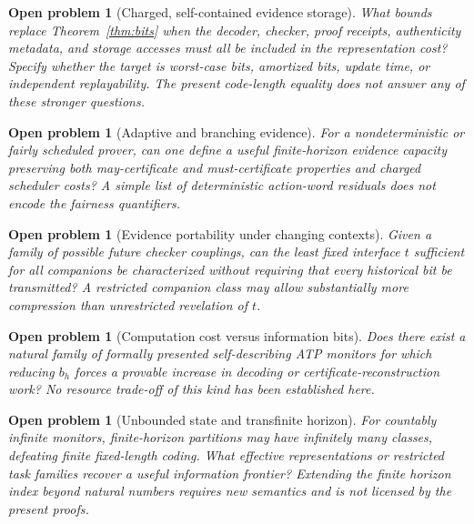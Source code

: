 \documentclass[11pt,letterpaper]{article}
\newtheorem{problem}[theorem]{Open problem}
\begin{document}
\begin{problem}[Charged, self-contained evidence storage]
What bounds replace Theorem~\ref{thm:bits} when the decoder, checker, proof receipts, authenticity metadata, and storage accesses must all be included in the representation cost? Specify whether the target is worst-case bits, amortized bits, update time, or independent replayability. The present code-length equality does not answer any of these stronger questions.
\end{problem}
\begin{problem}[Adaptive and branching evidence]
For a nondeterministic or fairly scheduled prover, can one define a useful finite-horizon evidence capacity preserving both \emph{may}-certificate and \emph{must}-certificate properties and charged scheduler costs? A simple list of deterministic action-word residuals does not encode the fairness quantifiers.
\end{problem}
\begin{problem}[Evidence portability under changing contexts]
Given a family of possible future checker couplings, can the least fixed interface $t$ sufficient for all companions be characterized without requiring that every historical bit be transmitted? A restricted companion class may allow substantially more compression than unrestricted revelation of $t$.
\end{problem}
\begin{problem}[Computation cost versus information bits]
Does there exist a natural family of formally presented self-describing ATP monitors for which reducing $b_h$ forces a provable increase in decoding or certificate-reconstruction work? No resource trade-off of this kind has been established here.
\end{problem}
\begin{problem}[Unbounded state and transfinite horizon]
For countably infinite monitors, finite-horizon partitions may have infinitely many classes, defeating finite fixed-length coding. What effective representations or restricted task families recover a useful information frontier? Extending the finite horizon index beyond natural numbers requires new semantics and is not licensed by the present proofs.
\end{problem}
\end{document}
